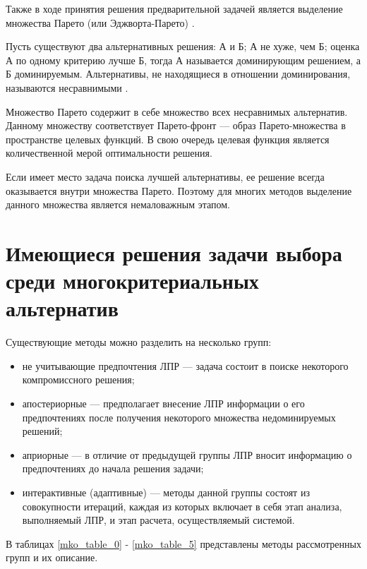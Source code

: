 Также в ходе принятия решения предварительной задачей является выделение множества Парето (или Эджворта-Парето) \cite{pareto}. 

Пусть существуют два альтернативных решения: А и Б; А не хуже, чем Б; оценка А по одному критерию лучше Б, тогда А называется доминирующим решением, а Б доминируемым. Альтернативы, не находящиеся в отношении доминирования, называются несравнимыми \cite{Larychev}.

Множество Парето содержит в себе множество всех несравнимых альтернатив. Данному множеству соответствует Парето-фронт \cite{pareto_f} --- образ Парето-множества в пространстве целевых функций. В свою очередь целевая функция является количественной мерой оптимальности решения.

Если имеет место задача поиска лучшей альтернативы, ее решение всегда оказывается внутри множества Парето. Поэтому для многих методов выделение данного множества является немаловажным этапом.

\newpage
\section{Имеющиеся решения задачи выбора среди многокритериальных альтернатив}

Существующие методы можно разделить на несколько групп:
\begin{itemize}
	\item не учитывающие предпочтения ЛПР --- задача состоит в поиске некоторого компромиссного решения;
	\item апостериорные --- предполагает внесение ЛПР информации о его предпочтениях после получения некоторого множества недоминируемых решений;
	\item априорные --- в отличие от предыдущей группы ЛПР вносит информацию о предпочтениях до начала решения задачи;
	\item интерактивные (адаптивные) --- методы данной группы состоят из совокупности итераций, каждая из которых включает в себя этап анализа, выполняемый ЛПР, и этап расчета, осуществляемый системой.
\end{itemize}

В таблицах \ref{mko_table_0} - \ref{mko_table_5} представлены методы рассмотренных групп и их описание.


